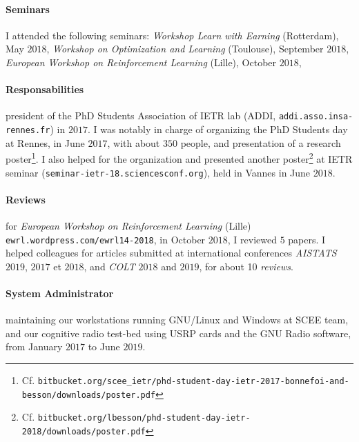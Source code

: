 \paragraph{Seminars} I attended the following seminars:
	\emph{Workshop Learn with Earning} (Rotterdam), May $2018$,
	\emph{Workshop on Optimization and Learning} (Toulouse), September $2018$,
	\emph{European Workshop on Reinforcement Learning} (Lille), October $2018$,

\paragraph{Responsabilities}
    president of the PhD Students Association of IETR lab (ADDI, \texttt{addi.asso.insa-rennes.fr}) in $2017$.
    I was notably in charge of organizing the PhD Students day at Rennes, in June $2017$, with about $350$ people, and presentation of a research poster\footnote{Cf. \texttt{bitbucket.org/scee_ietr/phd-student-day-ietr-2017-bonnefoi-and-besson/downloads/poster.pdf}}.
    I also helped for the organization and presented another poster\footnote{Cf. \texttt{bitbucket.org/lbesson/phd-student-day-ietr-2018/downloads/poster.pdf}} at IETR seminar (\texttt{seminar-ietr-18.sciencesconf.org}), held in Vannes in June $2018$.

    \paragraph{Reviews}
	for \emph{European Workshop on Reinforcement Learning} (Lille) \texttt{ewrl.wordpress.com/ewrl14-2018}, in October $2018$, I reviewed $5$ papers.
	I helped colleagues for articles submitted at international conferences \emph{AISTATS} $2019$,  $2017$ et $2018$, and \emph{COLT} $2018$ and $2019$, for about 10 \emph{reviews}.

\paragraph{System Administrator}
	maintaining our workstations running GNU/Linux and Windows
	at SCEE team,
	and our cognitive radio test-bed using USRP cards and the GNU Radio software,
	from January $2017$ to June $2019$.


